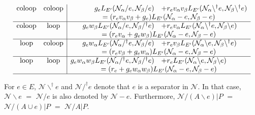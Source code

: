 \documentclass[Unicode]{cedram-alco}
\begin{document}
\begin{theo}
\begin{equation*}
\begin{array}{cc|rl}
      \text{coloop} & \text{coloop} &
      g_e L_{E'}(\mathcal{N}_\alpha/ e,  \mathcal{N}_\beta/ e) &+
      r_e \V_\alpha \V_\beta L_{E'}(\mathcal{N}_\alpha\backslash^\dag e,  \mathcal{N}_\beta \backslash^\dag e) \\
      & &
      \multicolumn{2}{c}{=( r_e \V_\alpha \V_\beta + g_e) L_{E'}(\mathcal{N}_\alpha- e,  \mathcal{N}_\beta - e)} \\  \hline
      
      \text{coloop} & \text{loop} &
           g_e \W_\beta L_{E'}(\mathcal{N}_\alpha/e,  \mathcal{N}_\beta/^\dag e) &+
           r_e \V_\alpha L_{E'}(\mathcal{N}_\alpha\backslash^\dag e,  \mathcal{N}_\beta \backslash e) \\
           & &
           \multicolumn{2}{c}{=( r_e \V_\alpha + g_e \W_\beta) L_{E'}(\mathcal{N}_\alpha- e,  \mathcal{N}_\beta - e)} \\  \hline
           
      \text{loop} & \text{coloop} &
     g_e \W_\alpha L_{E'}(\mathcal{N}_\alpha/^\dag e,  \mathcal{N}_\beta/e) &+
     r_e \V_\beta L_{E'}(\mathcal{N}_\alpha\backslash e,  \mathcal{N}_\beta \backslash^\dag e) \\
     & &
     \multicolumn{2}{c}{=(r_e \V_\beta + g_e \W_\alpha) L_{E'}(\mathcal{N}_\alpha- e,  \mathcal{N}_\beta - e)} \\  \hline
     
      \text{loop} & \text{loop} &
           g_e \W_\alpha \W_\beta L_{E'}(\mathcal{N}_\alpha/^\dag e,  \mathcal{N}_\beta/^\dag e) &+
           r_e L_{E'}(\mathcal{N}_\alpha\backslash e,  \mathcal{N}_\beta \backslash e) \\   
           & &
           \multicolumn{2}{c}{= (r_e + g_e \W_\alpha \W_\beta) L_{E'}(\mathcal{N}_\alpha - e,  \mathcal{N}_\beta - e)} \\  \hline
 

    \end{array}
  \end{equation*}

  For $e\in E$,
  $\mathcal{N}\backslash^\dag e$ and $\mathcal{N}/^\dag e$ denote that
  $e$ is a separator in $\mathcal{N}$.  In that case,
  $\mathcal{N}\backslash e$ $=$ $\mathcal{N}/ e$ is also
  denoted by $\mathcal{N}- e$.  Furthermore,
  $\mathcal{N}/(A\backslash e)|P$ $=$ $\mathcal{N}/(A \cup e)|P$ $=$ 
  $\mathcal{N}/A|P$.

\end{theo}
\end{document}
